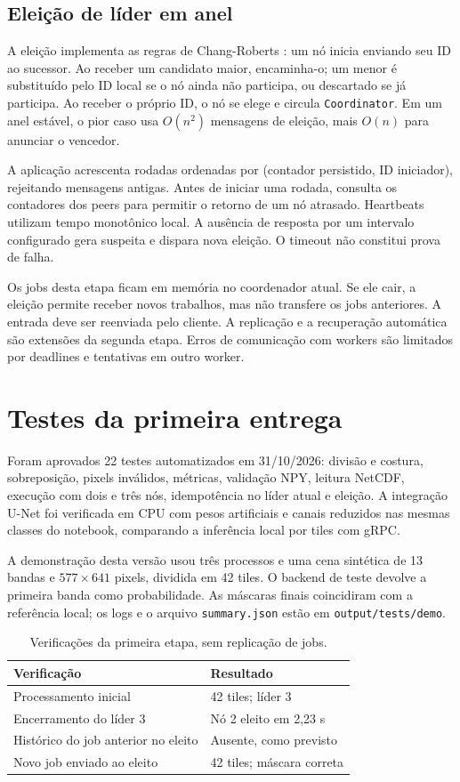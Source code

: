 \documentclass[12pt]{article}
\begin{document}
\subsection{Eleição de líder em anel}
A eleição implementa as regras de Chang-Roberts \cite{chang}: um nó inicia enviando seu ID ao sucessor. Ao receber um candidato maior, encaminha-o; um menor é substituído pelo ID local se o nó ainda não participa, ou descartado se já participa. Ao receber o próprio ID, o nó se elege e circula \texttt{Coordinator}. Em um anel estável, o pior caso usa $O(n^2)$ mensagens de eleição, mais $O(n)$ para anunciar o vencedor.

A aplicação acrescenta rodadas ordenadas por (contador persistido, ID iniciador), rejeitando mensagens antigas. Antes de iniciar uma rodada, consulta os contadores dos peers para permitir o retorno de um nó atrasado. Heartbeats utilizam tempo monotônico local. A ausência de resposta por um intervalo configurado gera suspeita e dispara nova eleição. O timeout não constitui prova de falha.

Os jobs desta etapa ficam em memória no coordenador atual. Se ele cair, a eleição permite receber novos trabalhos, mas não transfere os jobs anteriores. A entrada deve ser reenviada pelo cliente. A replicação e a recuperação automática são extensões da segunda etapa. Erros de comunicação com workers são limitados por deadlines e tentativas em outro worker.


\newpage
\section{Testes da primeira entrega}
Foram aprovados 22 testes automatizados em 31/10/2026: divisão e costura, sobreposição, pixels inválidos, métricas, validação NPY, leitura NetCDF, execução com dois e três nós, idempotência no líder atual e eleição. A integração U-Net foi verificada em CPU com pesos artificiais e canais reduzidos nas mesmas classes do notebook, comparando a inferência local por tiles com gRPC.

A demonstração desta versão usou três processos e uma cena sintética de 13 bandas e $577\times641$ pixels, dividida em 42 tiles. O backend de teste devolve a primeira banda como probabilidade. As máscaras finais coincidiram com a referência local; os logs e o arquivo \texttt{summary.json} estão em \texttt{output/tests/demo}.

\begin{table}[h]
\centering\small
\caption{Verificações da primeira etapa, sem replicação de jobs.}
\begin{tabular}{@{}p{8.8cm}p{4.5cm}@{}}\toprule
Verificação & Resultado\\\midrule
Processamento inicial & 42 tiles; líder 3\\
Encerramento do líder 3 & Nó 2 eleito em 2,23 s\\
Histórico do job anterior no eleito & Ausente, como previsto\\
Novo job enviado ao eleito & 42 tiles; máscara correta\\\bottomrule
\end{tabular}
\end{table}
\end{document}
